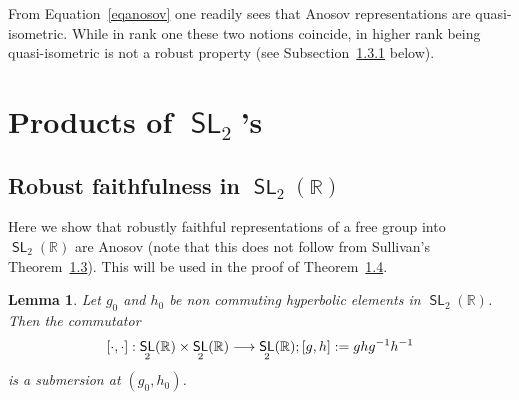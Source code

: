 \documentclass[10pt,a4paper]{amsart}
\DeclareMathOperator{\SL}{\mathsf{SL}}
\newcommand{\R}{\mathbb{R}}
\renewcommand*{\to}{\mathchoice{\longrightarrow}{\rightarrow}{\rightarrow}{\rightarrow}}
\numberwithin{equation}{section}
\newtheorem{lemm}[theo]{Lemma}
\theoremstyle{definition}\newtheorem{defi}[theo]{Definition}
\begin{document}
From Equation~\eqref{eqanosov} one readily sees that Anosov representations are quasi-isometric. While in rank one these two notions coincide, in higher rank being quasi-isometric is not a robust property (see Subsection~\href{https://ahl.centre-mersenne.org/item/AHL_2025__8_965_0/}{1.3.1} below).

\section{Products of \texorpdfstring{$\SL_2$}{SL\_2}'s}\label{sec: products}

\subsection{Robust faithfulness in $\SL_2(\R)$}\label{ss.SL2}

Here we show that robustly faithful representations of a free group into $\SL_2(\R)$ are Anosov (note that this does not follow from Sullivan's Theorem~\href{https://ahl.centre-mersenne.org/item/AHL_2025__8_965_0/}{1.3}). This will be used in the proof of Theorem~\href{https://ahl.centre-mersenne.org/item/AHL_2025__8_965_0/}{1.4}.

\begin{lemm}\label{lem: commutator is submersion}
Let $g_0$ and $h_0$ be non commuting hyperbolic elements in $\SL_2(\R)$.
Then the commutator
\[
[\cdot,\cdot]:\SL_2(\R)\times\SL_2(\R)\to\SL_2(\R); [g,h]:=ghg^{-1}h^{-1}
\]
is a submersion at $(g_0,h_0)$.
\end{lemm}
\end{document}
